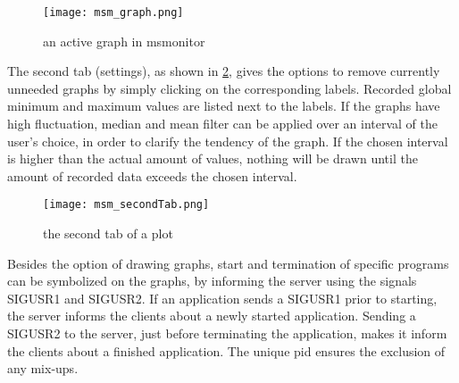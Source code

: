 \begin{figure}[t!]
	\begin{center}
		\texttt{[image: msm\_graph.png]} 
		\caption{an active graph in msmonitor}
		\label{fig:msm_graph}
	\end{center}
\end{figure}
The second tab (settings), as shown in \ref{fig:msm_secondTab}, gives the options to remove currently unneeded graphs by simply clicking on the corresponding labels. Recorded global minimum and maximum values are listed next to the labels.\newline
If the graphs have high fluctuation, median and mean filter can be applied over an interval of the user's choice, in order to clarify the tendency of the graph. If the chosen interval is higher than the actual amount of values, nothing will be drawn until the amount of recorded data exceeds the chosen interval.
\begin{figure}[t!]
	\begin{center}
		\texttt{[image: msm\_secondTab.png]} 
		\caption{the second tab of a plot}
		\label{fig:msm_secondTab}
	\end{center}
\end{figure}
Besides the option of drawing graphs, start and termination of specific programs can be symbolized on the graphs, by informing the server using the signals SIGUSR1 and SIGUSR2. If an application sends a SIGUSR1 prior to starting, the server informs the clients about a newly started application. Sending a SIGUSR2 to the server, just before terminating the application, makes it inform the clients about a finished application. The unique pid ensures the exclusion of any mix-ups. 



